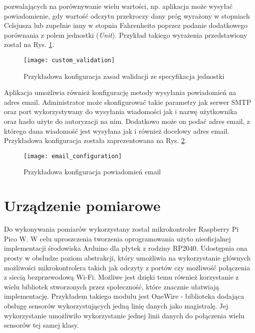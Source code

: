 pozwalających na porównywanie wielu wartości, np. aplikacja może wysyłać powiadomienie, gdy
wartość odczytu przekroczy dany próg wyrażony w stopniach Celsjusza lub zupełnie inny
w stopnia Fahrenheita poprzez podanie dodatkowego porównania z polem jednostki (\textit{Unit}).
Przykład takiego wyrażenia przedstawiony został na Rys. \ref{atmosphere:custom_validation}.
\begin{figure}[h!]
  \centering
  \texttt{[image: custom\_validation]}
  \caption{Przykładowa konfiguracja zasad walidacji ze specyfikacja jednostki}
  \label{atmosphere:custom_validation}
\end{figure}
Aplikacja umożliwia również konfigurację metody wysyłania powiadomień na adres email.
Administrator może skonfigurować takie parametry jak serwer SMTP oraz port wykorzystywany
do wysyłania wiadomości jak i nazwę użytkownika oraz hasło użyte do autoryzacji na nim.
Dodatkowo może on podać adres email, z którego dana wiadomość jest wysyłana jak i również
docelowy adres email. Przykładowa konfiguracja została zaprezentowana na Rys. \ref{atmosphere:email_configuration}.
\begin{figure}[h!]
  \centering
  \texttt{[image: email\_configuration]}
  \caption{Przykładowa konfiguracja powiadomień email}
  \label{atmosphere:email_configuration}
\end{figure}

\section{Urządzenie pomiarowe}
Do wykonywania pomiarów wykorzystany został mikrokontroler Raspberry Pi Pico W.
W celu uproszczenia tworzenia oprogramowania użyto nieoficjalnej implementacji
środowiska Arduino dla płytek z rodziny RP2040. Udostępnia ona prosty
w obsłudze poziom abstrakcji, który umożliwia na wykorzystanie głównych
możliwości mikrokontrolera takich jak odczyty z portów czy możliwość połączenia
z siecią bezprzewodową Wi-Fi. Możliwe jest dzięki temu również korzystanie z
wielu bibliotek stworzonych przez społeczność, które znacznie ułatwiają implementację.
Przykładem takiego modułu jest OneWire - biblioteka dodająca obsługę sensorów 
wykorzystujących jedną linię danych jako magistralę.
Jej wykorzystanie umożliwiło wykorzystanie jednej linii danych do połączenia wielu 
sensorów tej samej klasy.

